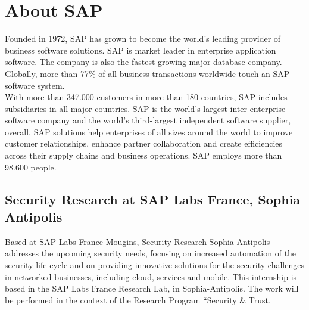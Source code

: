 \chapter*{About SAP}

Founded in 1972, SAP has grown to become the world's leading provider of business software solutions. SAP is market leader in enterprise application software. The company is also the fastest-growing major database company. Globally, more than 77\% of all business transactions worldwide touch an SAP software system. \\

With more than 347.000 customers in more than 180 countries, SAP includes subsidiaries in all major countries. SAP is the world's largest inter-enterprise software company and the world's third-largest independent software supplier, overall. SAP solutions help enterprises of all sizes around the world to improve customer relationships, enhance partner collaboration and create efficiencies across their supply chains and business operations. SAP employs more than 98.600 people.

\section{Security Research at SAP Labs France, Sophia Antipolis} 

Based at SAP Labs France Mougins, Security Research Sophia-Antipolis\cite{sap} addresses the upcoming security needs, focusing on increased automation of the security life cycle and on providing innovative solutions for the security challenges in networked businesses, including cloud, services and mobile. This internship is based in the SAP Labs France Research Lab, in Sophia-Antipolis. The work will be performed in the context of the Research Program “Security {\&} Trust.